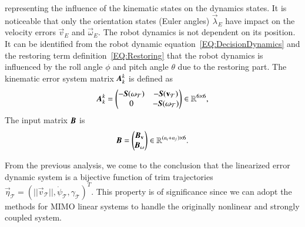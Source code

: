 representing the influence of the kinematic states on the dynamics states. It is noticeable that only the orientation states (Euler angles) 
$\vec{\lambda}_{E}$ have impact on the velocity errors $\vec{v}_{E}$ and 
$\vec{\omega}_{E}$. The robot dynamics is not dependent on its position. 
It can be identified from the robot dynamic equation~\ref{EQ:DecisionDynamics} and the restoring term definition~\ref{EQ:Restoring} that the robot dynamics is influenced by the roll angle $\phi$ and pitch angle $\theta$ due to the restoring part. 
The kinematic error system matrix $\emph{\textbf{A}}_{k}^{k}$ is defined as   
\begin{align}
\emph{\textbf{A}}_{k}^{k}=
\begin{pmatrix}
-\emph{\textbf{S}}(\vec{\omega}_{\mathcal{T}})&-\emph{\textbf{S}}(\vec{v}_{\mathcal{T}})\\
0&-\emph{\textbf{S}}(\vec{\omega}_{\mathcal{T}})
\end{pmatrix}\in \mathbb{R}^{6 \times 6},
\end{align}
The input matrix $\emph{\textbf{B}}$ is
\begin{align}
\emph{\textbf{B}}=
\begin{pmatrix}
\emph{\textbf{B}}_{\vec{v}}\\
\emph{\textbf{B}}_{\vec{\omega}}
\end{pmatrix} \in \mathbb{R}^{(n_{t}+n_{f})\times 6}.
\end{align}

From the previous analysis, we come to the conclusion that the linearized error dynamic system is a bijective function of trim trajectories $\vec{\eta}_{\mathcal{T}}=(||\vec{v}_{\mathcal{T}}||,   \dot{\psi}_{\mathcal{T}}, \gamma_{\mathcal{T}})^{T}$. This property is of significance since we can adopt the methods for MIMO linear systems to handle the originally nonlinear and strongly coupled system. 

